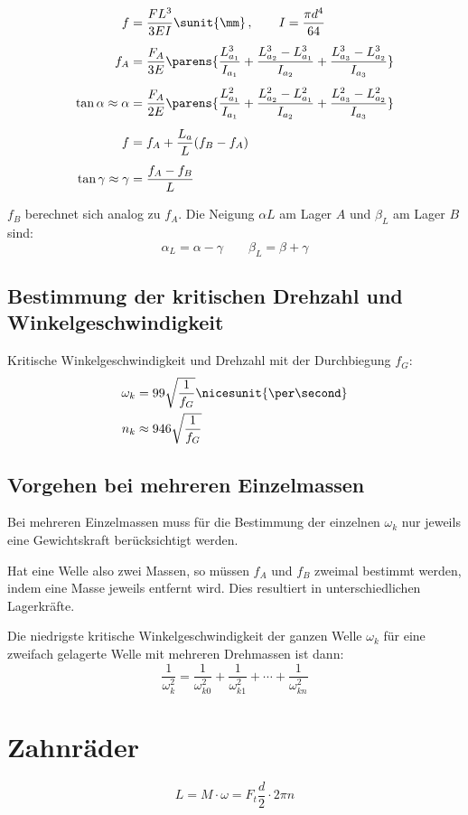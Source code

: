 			\begin{align*}
				f &= \frac{F L^3}{3 E I}\sunit{\mm}\,,\qquad I = \frac{\pi d^4}{64} \\[1ex]
				f_A &= \frac{F_A}{3E} \parens{
					\frac{L_{a_1}^3}{I_{a_1}} + \frac{L_{a_2}^3 - L_{a_1}^3}{I_{a_2}} + \frac{L_{a_3}^3 - L_{a_2}^3}{I_{a_3}}
				} \\[1ex]
				\tan \alpha \approx \alpha &= \frac{F_A}{2E} \parens{
					\frac{L_{a_1}^2}{I_{a_1}} + \frac{L_{a_2}^2 - L_{a_1}^2}{I_{a_2}} + \frac{L_{a_3}^2 - L_{a_2}^2}{I_{a_3}}
				} \\[1ex]
				f &= f_A + \frac{L_a}{L}(f_B - f_A) \\[1ex]
				\tan \gamma \approx \gamma &= \frac{f_A - f_B}{L}
			\end{align*}
			
			$f_B$ berechnet sich analog zu $f_A$. Die Neigung $\alpha L$ am Lager $A$ und $\beta_L$ am Lager $B$ sind:
			\begin{equation*}
				\alpha_L = \alpha - \gamma \qquad \beta_L = \beta + \gamma
			\end{equation*}
	\subsection{Bestimmung der kritischen Drehzahl und Winkelgeschwindigkeit} %
		Kritische Winkelgeschwindigkeit und Drehzahl mit der Durchbiegung $f_G$:
		\begin{align*}
			\omega_k &= 99 \sqrt \frac{1}{f_G} \nicesunit{\per\second} \\
			n_k &\approx 946 \sqrt{\frac{1}{f_G}}
		\end{align*}
	\subsection{Vorgehen bei mehreren Einzelmassen} %
		Bei mehreren Einzelmassen muss für die Bestimmung der einzelnen $\omega_k$ nur jeweils eine Gewichtskraft berücksichtigt werden.
		
		Hat eine Welle also zwei Massen, so müssen $f_A$ und $f_B$ zweimal bestimmt werden, indem eine Masse jeweils entfernt wird. Dies resultiert in unterschiedlichen Lagerkräfte.
		
		Die niedrigste kritische Winkelgeschwindigkeit der ganzen Welle $\omega_k$ für eine zweifach gelagerte Welle mit mehreren Drehmassen ist dann:
		\begin{equation*}
			\frac{1}{\omega_k^2} = \frac{1}{\omega_{k0}^2} + \frac{1}{\omega_{k1}^2} + \cdots + \frac{1}{\omega_{kn}^2}
		\end{equation*}

\section{Zahnräder} %
	\[
		L = M\cdot \omega = F_t \frac{d}{2} \cdot 2\pi n
	\]
